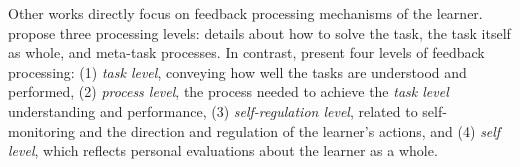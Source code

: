 Other works directly focus on feedback processing mechanisms of the learner. \citet{kluger_effects_1996} propose three processing levels: details about how to solve the task, the task itself as whole, and meta-task processes.
In contrast, \citet{hattie_power_2007} present four levels of feedback processing: (1) \textit{task level}, conveying how well the tasks are understood and performed, (2) \textit{process level}, the process needed to achieve the \textit{task level} understanding and performance, (3) \textit{self-regulation level}, related to self-monitoring and the direction and regulation of the learner's actions, and (4) \textit{self level}, which reflects personal evaluations about the learner as a whole.
